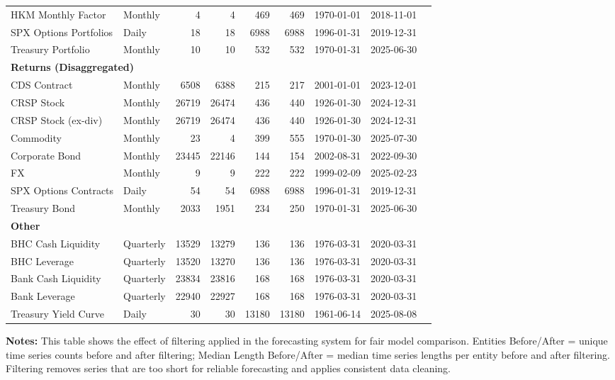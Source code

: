 \begin{table}[htbp]
\begin{tabular}{@{}llrrrrlll@{}}
HKM Monthly Factor & Monthly & 4 & 4 & 469 & 469 & 1970-01-01 & 2018-11-01 \\
SPX Options Portfolios & Daily & 18 & 18 & 6988 & 6988 & 1996-01-31 & 2019-12-31 \\
Treasury Portfolio & Monthly & 10 & 10 & 532 & 532 & 1970-01-31 & 2025-06-30 \\
\midrule
\multicolumn{8}{l}{\textbf{Returns (Disaggregated)}} \\
CDS Contract & Monthly & 6508 & 6388 & 215 & 217 & 2001-01-01 & 2023-12-01 \\
CRSP Stock & Monthly & 26719 & 26474 & 436 & 440 & 1926-01-30 & 2024-12-31 \\
CRSP Stock (ex-div) & Monthly & 26719 & 26474 & 436 & 440 & 1926-01-30 & 2024-12-31 \\
Commodity & Monthly & 23 & 4 & 399 & 555 & 1970-01-30 & 2025-07-30 \\
Corporate Bond & Monthly & 23445 & 22146 & 144 & 154 & 2002-08-31 & 2022-09-30 \\
FX & Monthly & 9 & 9 & 222 & 222 & 1999-02-09 & 2025-02-23 \\
SPX Options Contracts & Daily & 54 & 54 & 6988 & 6988 & 1996-01-31 & 2019-12-31 \\
Treasury Bond & Monthly & 2033 & 1951 & 234 & 250 & 1970-01-31 & 2025-06-30 \\
\midrule
\multicolumn{8}{l}{\textbf{Other}} \\
BHC Cash Liquidity & Quarterly & 13529 & 13279 & 136 & 136 & 1976-03-31 & 2020-03-31 \\
BHC Leverage & Quarterly & 13520 & 13270 & 136 & 136 & 1976-03-31 & 2020-03-31 \\
Bank Cash Liquidity & Quarterly & 23834 & 23816 & 168 & 168 & 1976-03-31 & 2020-03-31 \\
Bank Leverage & Quarterly & 22940 & 22927 & 168 & 168 & 1976-03-31 & 2020-03-31 \\
Treasury Yield Curve & Daily & 30 & 30 & 13180 & 13180 & 1961-06-14 & 2025-08-08 \\
\bottomrule
\end{tabular}
\vspace{0.1cm}
\begin{minipage}{\textwidth}
\scriptsize
\textbf{Notes:} This table shows the effect of filtering applied in the forecasting system for fair model comparison. 
Entities Before/After = unique time series counts before and after filtering; 
Median Length Before/After = median time series lengths per entity before and after filtering. 
Filtering removes series that are too short for reliable forecasting and applies consistent data cleaning.
\end{minipage}
\end{table}